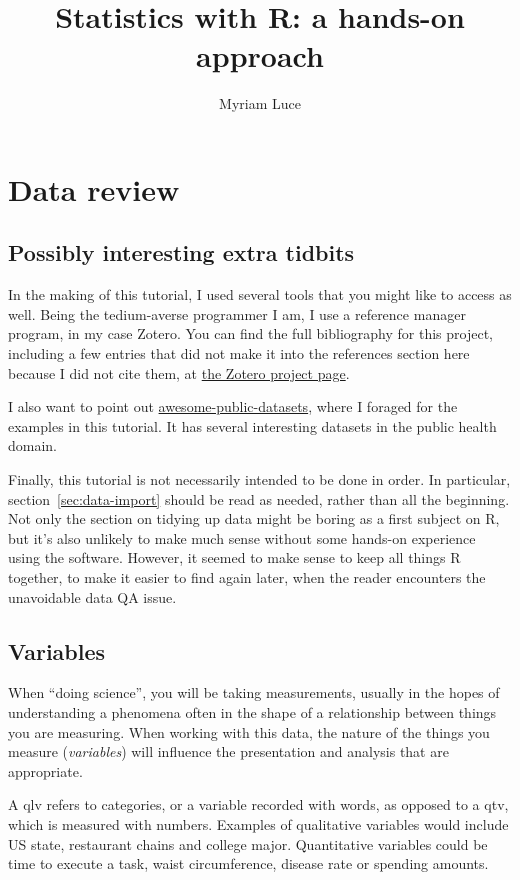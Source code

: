 \documentclass{report}
\author{Myriam Luce}
\title{Statistics with R: a hands-on approach}
\begin{document}
\maketitle
\tableofcontents

\chapter{Data review}
	\section{Possibly interesting extra tidbits}
	In the making of this tutorial, I used several tools that you might like to access as well. Being the tedium-averse programmer I am, I use a reference manager program, in my case Zotero. You can find the full bibliography for this project, including a few entries that did not make it into the references section here because I did not cite them, at \href{https://www.zotero.org/groups/2223910/r_tutorial}{the Zotero project page}.
	
	I also want to point out \href{https://github.com/awesomedata/awesome-public-datasets}{awesome-public-datasets}, where I foraged for the examples in this tutorial. It has several interesting datasets in the public health domain.
	
	Finally, this tutorial is not necessarily intended to be done in order. In particular, section~\ref{sec:data-import} should be read as needed, rather than all the beginning. Not only the section on tidying up data might be boring as a first subject on R, but it's also unlikely to make much sense without some hands-on experience using the software. However, it seemed to make sense to keep all things R together, to make it easier to find again later, when the reader encounters the unavoidable data QA issue.

	\section{Variables}
	When ``doing science'', you will be taking measurements, usually in the hopes of understanding a phenomena often in the shape of a relationship between things you are measuring. When working with this data, the nature of the things you measure (\emph{variables}) will influence the presentation and analysis that are appropriate.
	
	A \gls{qlv} refers to categories, or a variable recorded with words, as opposed to a \gls{qtv}, which is measured with numbers. Examples of qualitative variables would include US state, restaurant chains and college major. Quantitative variables could be time to execute a task, waist circumference, disease rate or spending amounts.
	
\end{document}
